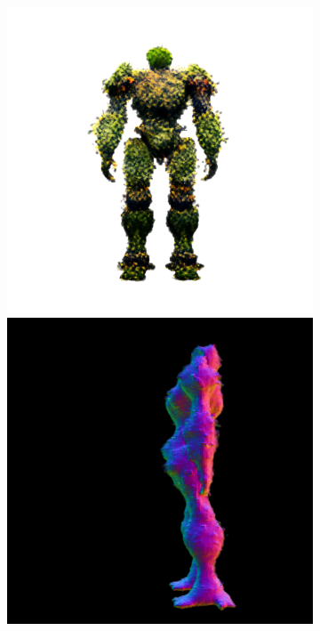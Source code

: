 \begin{figure}[ht]
\begin{subfigure}[b]{0.222\textwidth}
        \includegraphics[width=\textwidth]{etc/a robot made out of plants/magic123/magic123_coarse_robot_back_5000_part1.png}
        \includegraphics[width=\textwidth]{etc/a robot made out of plants/magic123/magic123_coarse_robot_left_5000_part2.png}

\end{subfigure}
\end{figure}
